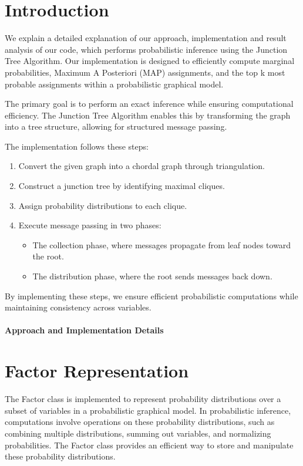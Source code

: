 

\section{Introduction}
We explain a detailed explanation of our approach, implementation and result analysis of our code, which performs probabilistic inference using the Junction Tree Algorithm. Our implementation is designed to efficiently compute marginal probabilities, Maximum A Posteriori (MAP) assignments, and the top k most probable assignments within a probabilistic graphical model.

The primary goal is to perform an exact inference while ensuring computational efficiency. The Junction Tree Algorithm enables this by transforming the graph into a tree structure, allowing for structured message passing.

The implementation follows these steps:
\begin{enumerate}
    \item Convert the given graph into a chordal graph through triangulation.
    \item Construct a junction tree by identifying maximal cliques.
    \item Assign probability distributions to each clique.
    \item Execute message passing in two phases:
    \begin{itemize}
        \item The collection phase, where messages propagate from leaf nodes toward the root.
        \item The distribution phase, where the root sends messages back down.
    \end{itemize}
\end{enumerate}

By implementing these steps, we ensure efficient probabilistic computations while maintaining consistency across variables.
\\\\
\textbf{\huge{Approach and Implementation Details}}

\section{Factor Representation}

The Factor class is implemented to represent probability distributions over a subset of variables in a probabilistic graphical model. In probabilistic inference, computations involve operations on these probability distributions, such as combining multiple distributions, summing out variables, and normalizing probabilities. The Factor class provides an efficient way to store and manipulate these probability distributions.

